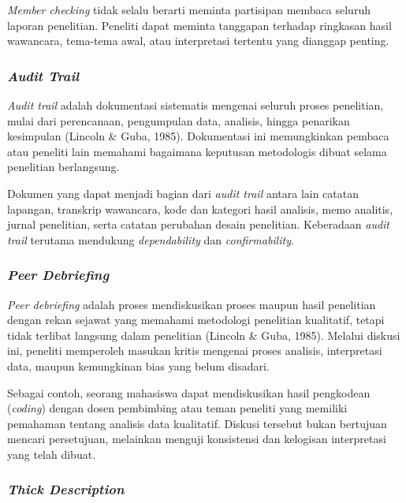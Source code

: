 \documentclass[
  indonesian,
  letterpaper,
  DIV=11,
  numbers=noendperiod]{scrreprt}
\begin{document}
\emph{Member checking} tidak selalu berarti meminta partisipan membaca
seluruh laporan penelitian. Peneliti dapat meminta tanggapan terhadap
ringkasan hasil wawancara, tema-tema awal, atau interpretasi tertentu
yang dianggap penting.

\subsubsection{\texorpdfstring{\emph{Audit
Trail}}{Audit Trail}}\label{audit-trail}

\emph{Audit trail} adalah dokumentasi sistematis mengenai seluruh proses
penelitian, mulai dari perencanaan, pengumpulan data, analisis, hingga
penarikan kesimpulan (Lincoln \& Guba, 1985). Dokumentasi ini
memungkinkan pembaca atau peneliti lain memahami bagaimana keputusan
metodologis dibuat selama penelitian berlangsung.

Dokumen yang dapat menjadi bagian dari \emph{audit trail} antara lain
catatan lapangan, transkrip wawancara, kode dan kategori hasil analisis,
memo analitis, jurnal penelitian, serta catatan perubahan desain
penelitian. Keberadaan \emph{audit trail} terutama mendukung
\emph{dependability} dan \emph{confirmability}.

\subsubsection{\texorpdfstring{\emph{Peer
Debriefing}}{Peer Debriefing}}\label{peer-debriefing}

\emph{Peer debriefing} adalah proses mendiskusikan proses maupun hasil
penelitian dengan rekan sejawat yang memahami metodologi penelitian
kualitatif, tetapi tidak terlibat langsung dalam penelitian (Lincoln \&
Guba, 1985). Melalui diskusi ini, peneliti memperoleh masukan kritis
mengenai proses analisis, interpretasi data, maupun kemungkinan bias
yang belum disadari.

Sebagai contoh, seorang mahasiswa dapat mendiskusikan hasil pengkodean
(\emph{coding}) dengan dosen pembimbing atau teman peneliti yang
memiliki pemahaman tentang analisis data kualitatif. Diskusi tersebut
bukan bertujuan mencari persetujuan, melainkan menguji konsistensi dan
kelogisan interpretasi yang telah dibuat.

\subsubsection{\texorpdfstring{\emph{Thick
Description}}{Thick Description}}\label{thick-description}
\end{document}
